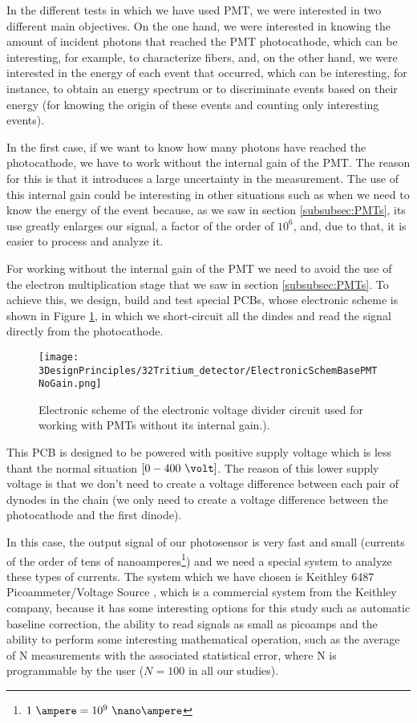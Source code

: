 In the different tests in which we have used PMT, we were interested in two different main objectives. On the one hand, we were interested in knowing the amount of incident photons that reached the PMT photocathode, which can be interesting, for example, to characterize fibers, and, on the other hand, we were interested in the energy of each event that occurred, which can be interesting, for instance, to obtain an energy spectrum or to discriminate events based on their energy (for knowing the origin of these events and counting only interesting events).

In the first case, if we want to know how many photons have reached the photocathode, we have to work without the internal gain of the PMT. The reason for this is that it introduces a large uncertainty in the measurement. The use of this internal gain could be interesting in other situations such as when we need to know the energy of the event because, as we saw in section \ref{subsubsec:PMTs}, its use greatly enlarges our signal, a factor of the order of $10^6$, and, due to that, it is easier to process and analyze it.

For working without the internal gain of the PMT we need to avoid the use of the electron multiplication stage that we saw in section \ref{subsubsec:PMTs}. To achieve this, we design, build and test special PCBs, whose electronic scheme is shown in Figure \ref{fig:ElectronicSchemeBasePMTNoGain}, in which we short-circuit all the dindes and read the signal directly from the photocathode.

\begin{figure}[htbp]
\centering
\texttt{[image: 3DesignPrinciples/32Tritium\_detector/ElectronicSchemBasePMTNoGain.png]}
\caption{Electronic scheme of the electronic voltage divider circuit used for working with PMTs without its internal gain.).\label{fig:ElectronicSchemeBasePMTNoGain}}
\end{figure}

This PCB is designed to be powered with positive supply voltage which is less thant the normal situation $[0-400~\volt]$. The reason of this lower supply voltage is that we don't need to create a voltage difference between each pair of dynodes in the chain (we only need to create a voltage difference between the photocathode and the first dinode).

In this case, the output signal of our photosensor is very fast and small (currents of the order of tens of nanoamperes\footnote{$1~\ampere=10^{9}~\nano\ampere$}) and we need a special system to analyze these types of currents. The system which we have chosen is Keithley 6487 Picoammeter/Voltage Source \cite{DataSheetKeithley6487}, which is a commercial system from the Keithley company, because it has some interesting options for this study such as automatic baseline correction, the ability to read signals as small as picoamps and the ability to perform some interesting mathematical operation, such as the average of N measurements with the associated statistical error, where N is programmable by the user ($N=100$ in all our studies).

